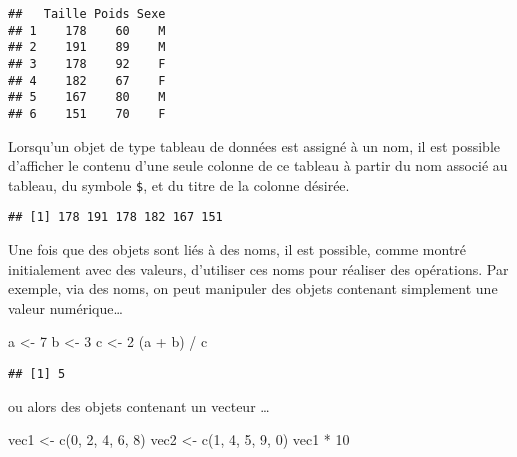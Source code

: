 \documentclass[
]{book}
\newenvironment{Shaded}{\begin{snugshade}}{\end{snugshade}}
\newcommand{\DecValTok}[1]{\textcolor[rgb]{0.00,0.00,0.81}{#1}}
\newcommand{\FunctionTok}[1]{\textcolor[rgb]{0.00,0.00,0.00}{#1}}
\newcommand{\NormalTok}[1]{#1}
\newcommand{\OtherTok}[1]{\textcolor[rgb]{0.56,0.35,0.01}{#1}}
\newcommand{\SpecialCharTok}[1]{\textcolor[rgb]{0.00,0.00,0.00}{#1}}
\begin{document}
\begin{verbatim}
##   Taille Poids Sexe
## 1    178    60    M
## 2    191    89    M
## 3    178    92    F
## 4    182    67    F
## 5    167    80    M
## 6    151    70    F
\end{verbatim}

Lorsqu'un objet de type tableau de données est assigné à un nom, il est possible d'afficher le contenu d'une seule colonne de ce tableau à partir du nom associé au tableau, du symbole \texttt{\$}, et du titre de la colonne désirée.

\begin{Shaded}
\end{Shaded}

\begin{verbatim}
## [1] 178 191 178 182 167 151
\end{verbatim}

Une fois que des objets sont liés à des noms, il est possible, comme montré initialement avec des valeurs, d'utiliser ces noms pour réaliser des opérations. Par exemple, via des noms, on peut manipuler des objets contenant simplement une valeur numérique\ldots{}

\begin{Shaded}
\begin{Highlighting}[]
\NormalTok{a }\OtherTok{\textless{}{-}} \DecValTok{7}
\NormalTok{b }\OtherTok{\textless{}{-}} \DecValTok{3}
\NormalTok{c }\OtherTok{\textless{}{-}} \DecValTok{2}
\NormalTok{(a }\SpecialCharTok{+}\NormalTok{ b) }\SpecialCharTok{/}\NormalTok{ c}
\end{Highlighting}
\end{Shaded}

\begin{verbatim}
## [1] 5
\end{verbatim}

ou alors des objets contenant un vecteur \ldots{}

\begin{Shaded}
\begin{Highlighting}[]
\NormalTok{vec1 }\OtherTok{\textless{}{-}} \FunctionTok{c}\NormalTok{(}\DecValTok{0}\NormalTok{, }\DecValTok{2}\NormalTok{, }\DecValTok{4}\NormalTok{, }\DecValTok{6}\NormalTok{, }\DecValTok{8}\NormalTok{)}
\NormalTok{vec2 }\OtherTok{\textless{}{-}} \FunctionTok{c}\NormalTok{(}\DecValTok{1}\NormalTok{, }\DecValTok{4}\NormalTok{, }\DecValTok{5}\NormalTok{, }\DecValTok{9}\NormalTok{, }\DecValTok{0}\NormalTok{)}
\NormalTok{vec1 }\SpecialCharTok{*} \DecValTok{10}
\end{Highlighting}
\end{Shaded}
\end{document}

